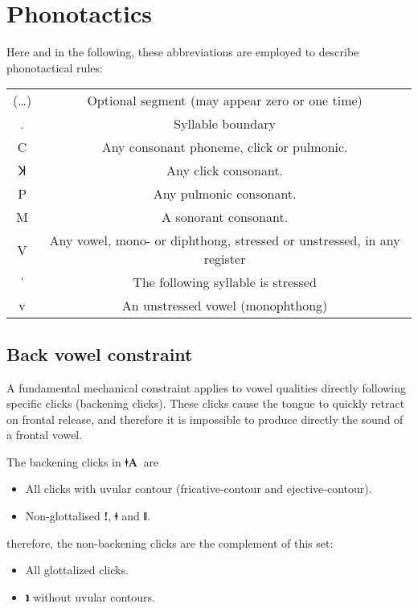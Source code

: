 \documentclass[11pt]{book}
\newcommand{\qcn}[1]{\textbf{#1}}
\newcommand{\langname}{\qcn{ǂA}~}
\begin{document}
\section{Phonotactics}

\newcommand{\stress}{ˈ}

Here and in the following, these abbreviations are employed to describe phonotactical rules:

\begin{center}
\begin{tabular}{cc}
	(\ldots) & Optional segment (may appear zero or one time)\\
	. & Syllable boundary \\
	C & Any consonant phoneme, click or pulmonic.\\
	Ʞ & Any click consonant. \\
	P & Any pulmonic consonant. \\
	M & A sonorant consonant.\\
	V & Any vowel, mono- or diphthong, stressed or unstressed, in any register \\
 \stress{} & The following syllable is stressed \\
	v & An unstressed vowel (monophthong) 
\end{tabular}
\end{center}

\subsection{Back vowel constraint}\label{sec:backvowelconstraint}

A fundamental mechanical constraint applies to vowel qualities directly following specific clicks (backening clicks). These clicks cause the tongue to quickly retract on frontal release, and therefore it is impossible to produce directly the sound of a frontal vowel. 

The backening clicks in \langname are

\begin{itemize}
	\item All clicks with uvular contour (fricative-contour and ejective-contour).
	\item Non-glottalised \qcn{ǃ}, \qcn{ǂ} and \qcn{ǁ}.
\end{itemize}

therefore, the non-backening clicks are the complement of this set:

\begin{itemize}
	\item All glottalized clicks.
	\item \qcn{ʇ} without uvular contours.
\end{itemize}
\end{document}
